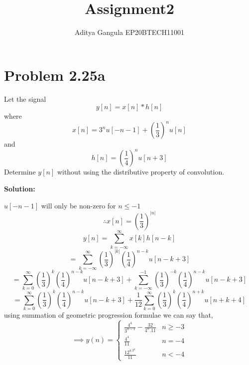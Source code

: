 \documentclass{article}
\title{Assignment2}
\author{Aditya Gangula EP20BTECH11001}
\begin{document}
\maketitle

\section*{Problem 2.25a}
Let the signal 
\[y[n] = x[n]*h[n]\]
where
\[x[n] = 3^nu[-n-1] + \left(\frac{1}{3}\right)^nu[n]\]
and
\[h[n] = \left(\frac{1}{4}\right)^nu[n+3]\]
Determine $y[n]$ without using the distributive property of convolution.

\raggedright \textbf {Solution:}

$u[-n-1]$ will only be non-zero for $n\leq-1$
\[\therefore x[n] = \left(\frac{1}{3}\right)^{|n|}\]
\[y[n] = \sum_{k=-\infty}^\infty x[k]h[n-k]\]
\[=\sum_{k=-\infty}^\infty \left(\frac{1}{3}\right)^{|k|}\left(\frac{1}{4}\right)^{n-k}u[n-k+3]\]
\[=\sum_{k=0}^\infty \left(\frac{1}{3}\right)^{k}\left(\frac{1}{4}\right)^{n-k}u[n-k+3] + \sum_{k=-\infty}^{-1} \left(\frac{1}{3}\right)^{-k}\left(\frac{1}{4}\right)^{n-k}u[n-k+3]\]
\[=\sum_{k=0}^\infty \left(\frac{1}{3}\right)^{k}\left(\frac{1}{4}\right)^{n-k}u[n-k+3] + \frac{1}{12}\sum_{k=0}^{\infty} \left(\frac{1}{3}\right)^{k}\left(\frac{1}{4}\right)^{n+k}u[n+k+4]\]
using summation of geometric progression formulae we can say that,
\[\implies y(n) = 
\begin{cases}
    \frac{4^4}{3^{n-1}} - \frac{32}{4^n.11} & n \geq -3
    \\
    \frac{4^4}{11} & n=-4
    \\
    \frac{12^4.3^n}{11} & n < -4
\end{cases}
\]
\end{document}
